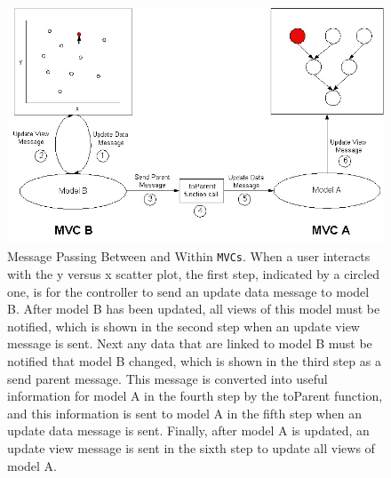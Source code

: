 \documentclass[11pt]{article}
\newcommand{\Rfunction}[1]{{\textsf{#1}}}
\newcommand{\Robject}[1]{{\texttt{#1}}}
\begin{document}
\begin{figure}[ht]
  \begin{center}
    \includegraphics[height=2.8in, width=4.5in]{newMP.jpg}
    \caption{ Message Passing Between and Within \Robject{MVCs}.  When a user
      interacts with the y versus x scatter plot, the first step, indicated by
      a circled one, is for the controller to send an update data message to
      model B.  After model B has been updated, all views of this model must
      be notified, which is shown in the second step when an update view
      message is sent.  Next any data that are linked to model B must be
      notified that model B changed, which is shown in the third step as a
      send parent message.  This message is converted into useful information
      for model A in the fourth step by the \Rfunction{toParent} function, and
      this information is sent to model A in the fifth step when an update data
      message is sent.  Finally, after model A is updated, an update view
      message is sent in the sixth step to update all views of model A. }
    \label{Fig:MessPass}
  \end{center}
\end{figure}

\end{document}

